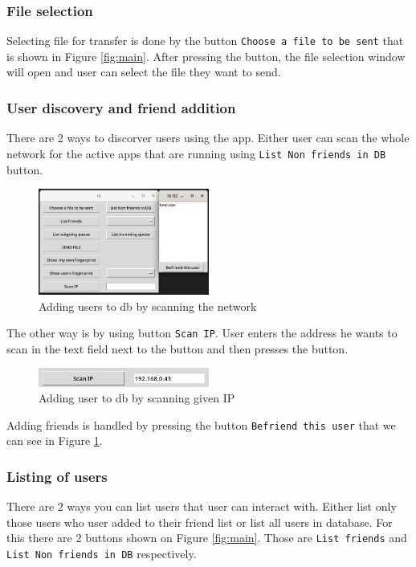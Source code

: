 \subsubsection{File selection}
Selecting file for transfer is done by the button \texttt{Choose a file to be sent} that is shown in Figure \ref{fig:main}. 
After pressing the button, the file selection window will open and user can select the file they want to send.

\subsubsection{User discovery and friend addition}
There are 2 ways to discorver users using the app. Either user can scan the whole network for the active apps that are running using \texttt{List Non friends in DB} button.
\begin{figure}[h]
    \centering
    \includegraphics[width=0.5\textwidth]{images/ListNonFriends.png}
    \caption{Adding users to db by scanning the network}
    \label{fig:LNF}
\end{figure}
The other way is by using button \texttt{Scan IP}. User enters the address he wants to scan in the text field next to the button and then presses the button.
\begin{figure}[h]
    \centering
    \includegraphics[width=0.5\textwidth]{images/ScanIP.png}
    \caption{Adding user to db by scanning given IP}
    \label{fig:scanIP}
\end{figure}

Adding friends is handled by pressing the button \texttt{Befriend this user} that we can see in Figure \ref{fig:LNF}.

\subsubsection{Listing of users}
There are 2 ways you can list users that user can interact with. Either list only those users who user added to their friend list or list all users in database.
For this there are 2 buttons shown on Figure \ref{fig:main}. Those are \texttt{List friends} and \texttt{List Non friends in DB} respectively.

